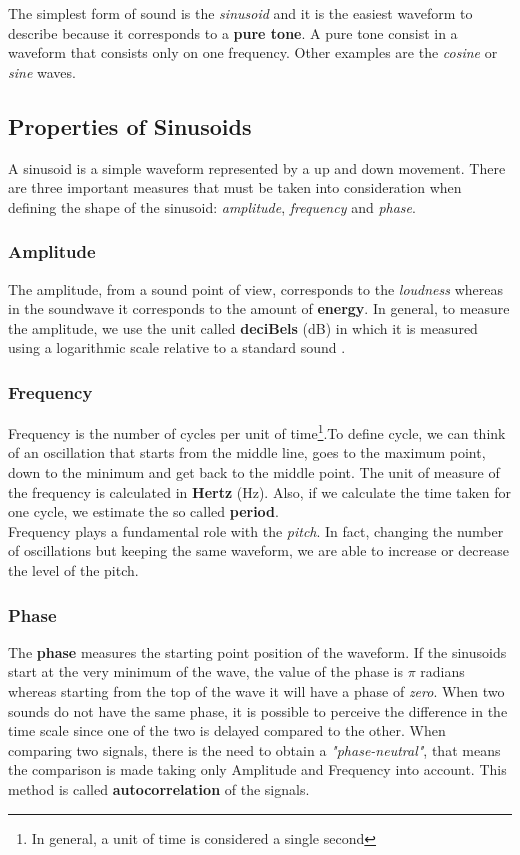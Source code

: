 \noindent The simplest form of sound is the \textit{sinusoid} and it is the easiest waveform to describe because it corresponds to a \textbf{pure tone}. A pure tone consist in a waveform that consists only on one frequency. Other examples are the \textit{cosine} or \textit{sine} waves.

\subsection{Properties of Sinusoids}
\label{sub:prop_of_sinusoids}
A sinusoid is a simple waveform represented by a up and down movement. There are three important measures that must be taken into consideration when defining the shape of the sinusoid: \textit{amplitude}, \textit{frequency} and \textit{phase}.

\subsubsection{Amplitude}
The amplitude, from a sound point of view, corresponds to the \textit{loudness} whereas in the soundwave it corresponds to the amount of \textbf{energy}. In general, to measure the amplitude, we use the unit called \textbf{deciBels} (dB) in which it is measured using a logarithmic scale relative to a standard sound \cite{prop_of_sinusoids}.

\subsubsection{Frequency}
Frequency is the number of cycles per unit of time\footnote{In general, a unit of time is considered a single second}.To define cycle, we can think of an oscillation that starts from the middle line, goes to the maximum point, down to the minimum and get back to the middle point. The unit of measure of the frequency is calculated in \textbf{Hertz} (Hz). Also, if we calculate the time taken for one cycle, we estimate the so called \textbf{period}. \\
\noindent Frequency plays a fundamental role with the \textit{pitch}. In fact, changing the number of oscillations but keeping the same waveform, we are able to increase or decrease the level of the pitch.

\subsubsection{Phase}
The \textbf{phase} measures the starting point position of the waveform. If the sinusoids start at the very minimum of the wave, the value of the phase is $\pi$ radians whereas starting from the top of the wave it will have a phase of \textit{zero}. When two sounds do not have the same phase, it is possible to perceive the difference in the time scale since one of the two is delayed compared to the other. When comparing two signals, there is the need to obtain a \textit{"phase-neutral"}, that means the comparison is made taking only Amplitude and Frequency into account. This method is called \textbf{autocorrelation} of the signals.

